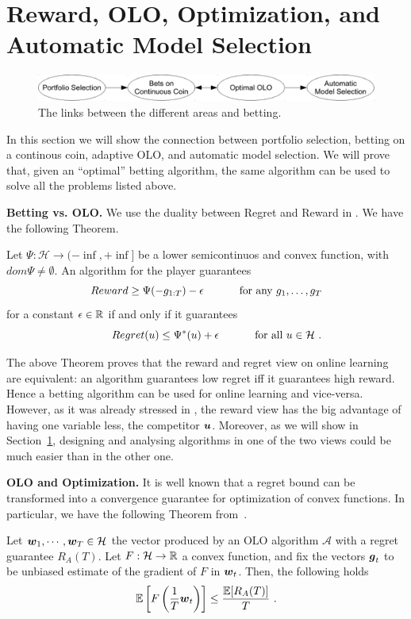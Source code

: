 \section{Reward, OLO, Optimization, and Automatic Model Selection}

\begin{figure}[t]
\centering
\includegraphics[width=.95\linewidth]{./figs/links_between_areas.pdf}
\caption{The links between the different areas and betting.}
\end{figure}

In this section we will show the connection between portfolio selection, betting on a continous coin, adaptive OLO, and automatic model selection. We will prove that, given an ``optimal'' betting algorithm, the same algorithm can be used to solve all the problems listed above.

\textbf{Betting vs. OLO.}
We use the duality between Regret and Reward in \citet{McMahanO14}.
We have the following Theorem.
\begin{theorem}
  \label{thm:rrdual}
  Let $\Psi:\mathcal{H} \rightarrow (-\inf, +\inf]$ be a lower semicontinuos and convex function, with $dom \Psi \neq \emptyset$. An
  algorithm for the player guarantees
  \[
  Reward \geq \Psi(-g_{1:T}) - \epsilon \quad \quad \quad \textnormal{ for any } g_1, \dots, g_T
  \]
  for a constant $\epsilon \in \mathbb{R}$ if and only if it
  guarantees
  \begin{equation}\label{eq:regb}
  \qquad Regret(u) \leq \Psi^*(u) + \epsilon \quad \quad \quad \textnormal{ for all } u \in \mathcal{H}~.
  \end{equation}
\end{theorem}

The above Theorem proves that the reward and regret view on online learning are equivalent: an algorithm guarantees low regret iff it guarantees high reward. Hence a betting algorithm can be used for online learning and vice-versa. However, as it was already stressed in \citet{McMahanO14}, the reward view has the big advantage of having one variable less, the competitor $\boldsymbol{u}$.
Moreover, as we will show in Section~\ref{}, designing and analysing algorithms in one of the two views could be much easier than in the other one.

\textbf{OLO and Optimization.}
It is well known that a regret bound can be transformed into a convergence guarantee for optimization of convex functions.
In particular, we have the following Theorem from~\citet{Cesa-BianchiCG04}.
%
\begin{theorem}
Let $\boldsymbol{w}_1, \cdots, \boldsymbol{w}_T \in \mathcal{H}$ the vector produced by an OLO algorithm $\mathcal{A}$ with a regret guarantee $R_A(T)$.
Let $F:\mathcal{H}\rightarrow\mathbb{R}$ a convex function, and fix the vectors $\boldsymbol{g}_t$ to be unbiased estimate of the gradient of $F$ in $\boldsymbol{w}_t$. Then, the following holds
\[
\mathbb{E}\left[F\left(\frac{1}{T} \boldsymbol{w}_t\right)\right] \leq \frac{\mathbb{E}[R_A(T)]}{T}~.
\]
\end{theorem}

